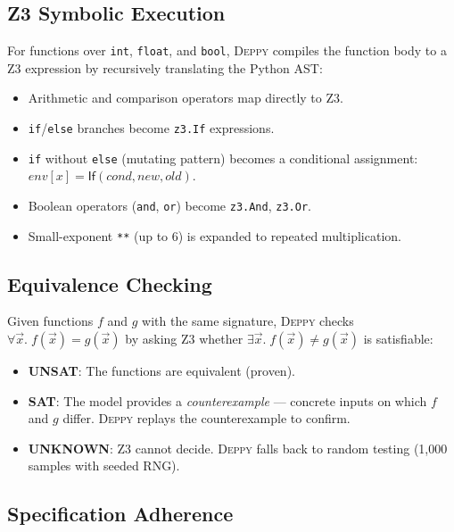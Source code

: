 \documentclass[acmsmall,nonacm,screen]{acmart}
\newcommand{\deppy}{\textsc{Deppy}}
\begin{document}
\subsection{Z3 Symbolic Execution}

For functions over \texttt{int}, \texttt{float}, and \texttt{bool},
\deppy{} compiles the function body to a Z3 expression by
recursively translating the Python AST:

\begin{itemize}
\item Arithmetic and comparison operators map directly to Z3.
\item \texttt{if}/\texttt{else} branches become \texttt{z3.If}
  expressions.
\item \texttt{if} without \texttt{else} (mutating pattern) becomes a
  conditional assignment: $\mathit{env}[x] = \mathsf{If}(\mathit{cond},
  \mathit{new}, \mathit{old})$.
\item Boolean operators (\texttt{and}, \texttt{or}) become
  \texttt{z3.And}, \texttt{z3.Or}.
\item Small-exponent \texttt{**} (up to 6) is expanded to
  repeated multiplication.
\end{itemize}

\subsection{Equivalence Checking}

Given functions $f$ and $g$ with the same signature, \deppy{} checks
$\forall \vec{x}.\; f(\vec{x}) = g(\vec{x})$ by asking Z3 whether
$\exists \vec{x}.\; f(\vec{x}) \ne g(\vec{x})$ is satisfiable:

\begin{itemize}
\item \textbf{UNSAT}: The functions are equivalent (proven).
\item \textbf{SAT}: The model provides a \emph{counterexample} ---
  concrete inputs on which $f$ and $g$ differ.  \deppy{} replays the
  counterexample to confirm.
\item \textbf{UNKNOWN}: Z3 cannot decide.  \deppy{} falls back to
  random testing (1,000 samples with seeded RNG).
\end{itemize}

\subsection{Specification Adherence}
\end{document}
